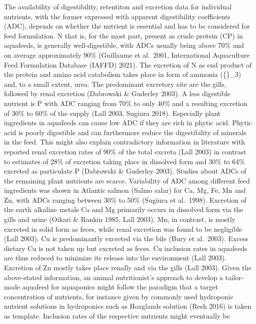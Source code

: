 \documentclass[preprint, 3p,
authoryear]{elsarticle} %
\begin{document}
The availability of digestibility, retentiton and excretion data for
individual nutrients, with the former expressed with apparent
digestibility coefficients (ADC), depends on whether the nutrient is
essential and has to be considered for feed formulation. N that is, for
the most part, present as crude protein (CP) in aquafeeds, is generally
well-digestible, with ADCs usually being above 70\% and on average
approximately 90\% (Guillaume et al.~2001, International Aquaculture
Feed Formulation Database (IAFFD) 2021). The excretion of N as end
product of the protein and amino acid catabolism takes place in form of
ammonia (\{\}\_3) and, to a small extent, urea. The
predominant excretory site are the gills, followed by renal excretion
(Dabrowski \& Guderley 2003). A less digestible nutrient is P with ADC
ranging from 70\% to only 40\% and a resulting excretion of 30\% to 60\%
of the supply (Lall 2003, Sugiura 2018). Especially plant ingredients in
aquafeeds can cause low ADC if they are rich in phytic acid. Phytic acid
is poorly digestible and can furthermore reduce the digestibility of
minerals in the feed. This might also explain contradictory information
in literature with reported renal excretion rates of 90\% of the total
excreta (Lall 2003) in contrast to estimates of 28\% of excretion taking
place in dissolved form and 30\% to 64\% excreted as particulate P
(Dabrowski \& Guderley 2003). Studies about ADCs of the remaining plant
nutrients are scarce. Variability of ADC among different feed
ingredients was shown in Atlantic salmon (Salmo salar) for Ca, Mg, Fe,
Mn and Zn, with ADCs ranging between 30\% to 50\% (Sugiura et al.~1998).
Excretion of the earth alkaline metals Ca and Mg primarily occurs in
dissolved form via the gills and urine (Oikari \& Rankin 1985, Lall
2003). Mn, in contrast, is mostly excreted in solid form as feces, while
renal excretion was found to be negligible (Lall 2003). Cu is
predominantly excreted via the bile (Bury et al.~2003). Excess dietary
Cu is not taken up but excreted as feces. Cu inclusion rates in
aquafeeds are thus reduced to minimize its release into the environment
(Lall 2003). Excretion of Zn mostly takes place renally and via the
gills (Lall 2003). Given the above-stated information, an animal
nutritionist's approach to develop a tailor-made aquafeed for aquaponics
might follow the paradigm that a target concentration of nutrients, for
instance given by commonly used hydroponic nutrient solutions in
hydroponics such as Hoaglands solution (Resh 2016) is taken as template.
Inclusion rates of the respective nutrients might eventually be
\end{document}
